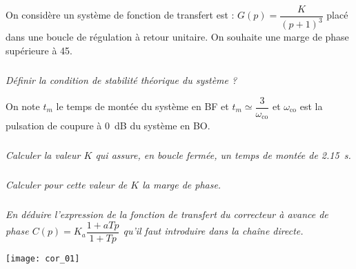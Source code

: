 \setcounter{exo}{0}
\begin{multicols}{2}


On considère un système de fonction de transfert est :  $G(p)=\dfrac{K}{(p+1)^3}$ placé dans une boucle de régulation à retour unitaire. On souhaite une marge de phase supérieure à 45\degres.

\subparagraph{}\textit{Définir la condition de stabilité théorique du système ? }


On note $t_m$ le temps de montée du système en BF et $t_m\simeq \dfrac{3}{\omega_{\text{co}}}$ et $\omega_{\text{co}}$ est la pulsation de coupure à \SI{0}{dB} du système en BO.  


\subparagraph{}\textit{Calculer la valeur $K$ qui assure, en boucle fermée, un temps de montée de \SI{2,15}{s}.}

\subparagraph{}\textit{Calculer pour cette valeur de $K$ la marge de phase.}

\subparagraph{}\textit{En déduire l'expression de la fonction de transfert du correcteur à avance de phase $C(p)=K_a\dfrac{1+aTp}{1+Tp}$ qu'il faut introduire dans la chaîne directe.  }

\end{multicols}
\ifprof
\newpage
\begin{center}

\texttt{[image: cor\_01]}
\end{center}
\else
\fi
